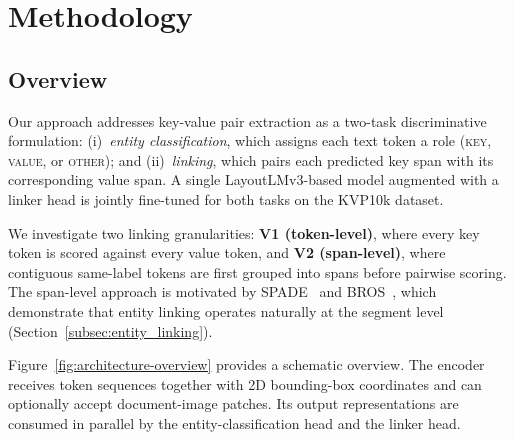 \chapter{Methodology}
\label{ch:methodology}

\section{Overview}
\label{sec:methodology-overview}

Our approach addresses key-value pair extraction as a two-task discriminative
formulation: (i)~\emph{entity classification}, which assigns each text token a role
(\textsc{key}, \textsc{value}, or \textsc{other}); and (ii)~\emph{linking},
which pairs each predicted key span with its corresponding value span.
A single LayoutLMv3-based model augmented with a linker head is jointly
fine-tuned for both tasks on the KVP10k dataset.

We investigate two linking granularities: \textbf{V1 (token-level)}, where
every key token is scored against every value token, and \textbf{V2
(span-level)}, where contiguous same-label tokens are first grouped into
spans before pairwise scoring. The span-level approach is motivated by
SPADE~\cite{spade} and BROS~\cite{bros}, which demonstrate that entity
linking operates naturally at the segment level (Section~\ref{subsec:entity_linking}).

Figure~\ref{fig:architecture-overview} provides a schematic overview.
The encoder receives token sequences together with 2D bounding-box coordinates
and can optionally accept document-image patches. Its output representations
are consumed in parallel by the entity-classification head and the linker head.


